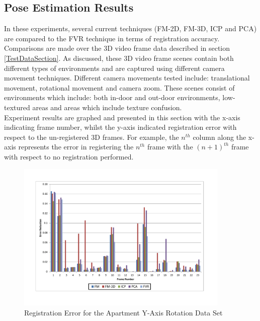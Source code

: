 \subsection{Pose Estimation Results}

In these experiments, several current techniques (FM-2D, FM-3D, ICP and PCA) are compared to the FVR technique in terms of registration accuracy. Comparisons are made over  the 3D video frame data described in section \ref{TestDataSection}. As discussed, these 3D video frame scenes contain both different types of environments and are captured using different camera movement techniques. Different camera movements tested include: translational movement, rotational movement and camera zoom. These scenes consist of environments which include: both in-door and out-door environments, low-textured areas and areas which include texture confusion. \\

Experiment results are graphed and presented in this section with the x-axis indicating frame number, whilst the y-axis indicated registration error with respect to the un-registered 3D frames. For example, the $n^{th}$ column along the x-axis represents the error in registering the $n^{th}$ frame with the $(n+1)^{th}$ frame with respect to no registration performed. \\ 


\begin{figure}[!htb]
\centering
\includegraphics[width=4.0in]{images/results/Apartment_Texture_Rotate}
\caption{Registration Error for the Apartment Y-Axis Rotation Data Set}
\label{fig:PET0}
\end{figure}

